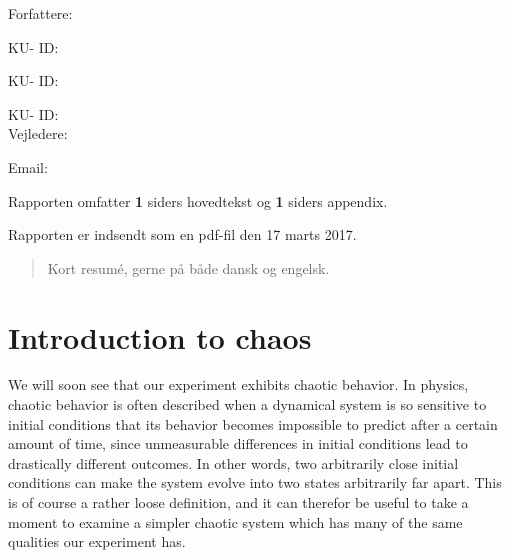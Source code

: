 \documentclass[12pt,oneside,a4paper]{article}
\numberwithin{equation}{section}
\begin{document}
\vfill
{\large Forfattere:}\\
{\large \hspace*{1cm}   \hspace{1cm} KU- ID:  \\
{\large \hspace*{1cm}    \hspace{1cm} KU- ID:  \\
{\large \hspace*{1cm}    \hspace{1cm} KU- ID:  \\

{\large Vejledere:}\\
{\large \hspace*{1cm}   \hspace{1cm} Email:  \\

\vfill

{\large Rapporten omfatter {\bf 1} siders hovedtekst og {\bf 1} siders appendix.}

{\large Rapporten er indsendt som en pdf-fil den 17 marts 2017. }

\normalsize


\newpage
\begin{abstract}
Kort resumé, gerne på både dansk og engelsk.
\end{abstract}

\newpage

\tableofcontents


\newpage
{}
\section{Introduction to chaos}
\label{chaos}
We will soon see that our experiment exhibits chaotic behavior. In physics, 
chaotic behavior is often described when a dynamical system is so sensitive to 
initial conditions that its behavior becomes impossible to predict after a 
certain amount of time, since unmeasurable differences in initial conditions 
lead to drastically different outcomes. In other words, two arbitrarily close 
initial conditions can make the system evolve into two states arbitrarily far 
apart. This is of course a rather loose definition, and it can therefor be 
useful to take a moment to examine a simpler chaotic system which has many of 
the same qualities our experiment has.

}}}}
\end{document}
